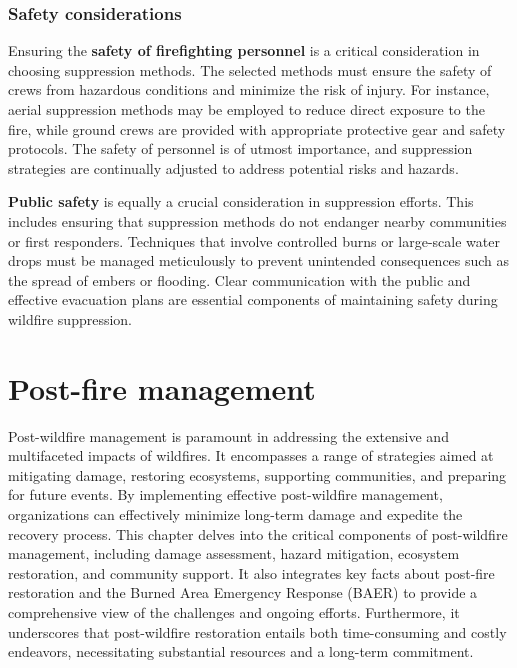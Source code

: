 \documentclass[
  12 pt,
]{Nemilov}
\begin{document}
\subsection{Safety considerations}\label{safety-considerations}

Ensuring the \textbf{safety of firefighting personnel} is a critical consideration in choosing suppression methods. The selected methods must ensure the safety of crews from hazardous conditions and minimize the risk of injury. For instance, aerial suppression methods may be employed to reduce direct exposure to the fire, while ground crews are provided with appropriate protective gear and safety protocols. The safety of personnel is of utmost importance, and suppression strategies are continually adjusted to address potential risks and hazards.

\textbf{Public safety} is equally a crucial consideration in suppression efforts. This includes ensuring that suppression methods do not endanger nearby communities or first responders. Techniques that involve controlled burns or large-scale water drops must be managed meticulously to prevent unintended consequences such as the spread of embers or flooding. Clear communication with the public and effective evacuation plans are essential components of maintaining safety during wildfire suppression.

\chapter{Post-fire management}\label{post-fire-management}

Post-wildfire management is paramount in addressing the extensive and multifaceted impacts of wildfires. It encompasses a range of strategies aimed at mitigating damage, restoring ecosystems, supporting communities, and preparing for future events. By implementing effective post-wildfire management, organizations can effectively minimize long-term damage and expedite the recovery process. This chapter delves into the critical components of post-wildfire management, including damage assessment, hazard mitigation, ecosystem restoration, and community support. It also integrates key facts about post-fire restoration and the Burned Area Emergency Response (BAER) to provide a comprehensive view of the challenges and ongoing efforts. Furthermore, it underscores that post-wildfire restoration entails both time-consuming and costly endeavors, necessitating substantial resources and a long-term commitment.
\end{document}
